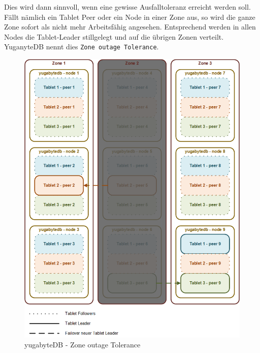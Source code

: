 \begin{flushleft}
    Dies wird dann sinnvoll, wenn eine gewisse Ausfalltoleranz erreicht werden soll.
    Fällt nämlich ein Tablet Peer oder ein Node in einer Zone aus, so wird die ganze Zone sofort als nicht mehr Arbeitsfähig angesehen.
    Entsprechend werden in allen Nodes die Tablet-Leader stillgelegt und auf die übrigen Zonen verteilt.
    YuganyteDB nennt dies \texttt{Zone outage Tolerance}\cite{PTKCP8A4}.
    \begin{figure}[H]
        \centering
        \includegraphics[width=0.8\linewidth]{source/implementation/evaluation/postgresql_ha_solutions/yugabytedb/yugabytedb-zone-outage-tolerance}
        \caption{yugabyteDB - Zone outage Tolerance}
        \label{fig:yugabytedb-zone-outage-tolerance}
    \end{figure}
\end{flushleft}
